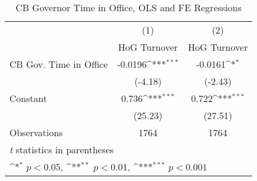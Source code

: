 \begin{table}[htbp]\centering
\def\sym#1{\ifmmode^{#1}\else\(^{#1}\)\fi}
\caption{CB Governor Time in Office, OLS and FE Regressions \label{timeinoffHOGalone}}
\begin{tabular}{l*{2}{c}}
\toprule
                                        &\multicolumn{1}{c}{(1)}&\multicolumn{1}{c}{(2)}\\
                                        &\multicolumn{1}{c}{HoG Turnover}&\multicolumn{1}{c}{HoG Turnover}\\
\midrule
CB Gov. Time in Office                  &  -0.0196\sym{***}&  -0.0161\sym{*}  \\
                                        &  (-4.18)         &  (-2.43)         \\
\addlinespace
Constant                                &    0.736\sym{***}&    0.722\sym{***}\\
                                        &  (25.23)         &  (27.51)         \\
\midrule
Observations                            &     1764         &     1764         \\
\bottomrule
\multicolumn{3}{l}{\footnotesize \textit{t} statistics in parentheses}\\
\multicolumn{3}{l}{\footnotesize \sym{*} \(p<0.05\), \sym{**} \(p<0.01\), \sym{***} \(p<0.001\)}\\
\end{tabular}
\end{table}

